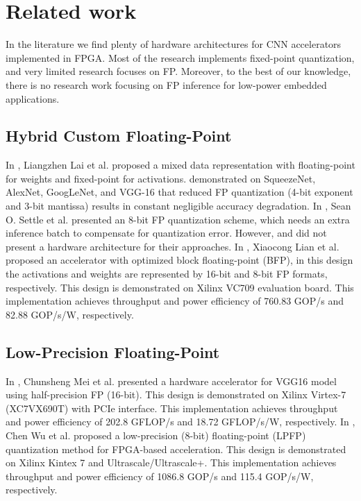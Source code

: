 \section{Related work}
\label{sec:related_work}
In the literature we find plenty of hardware architectures for CNN accelerators implemented in FPGA. Most of the research implements fixed-point quantization, and very limited research focuses on FP. Moreover, to the best of our knowledge, there is no research work focusing on FP inference for low-power embedded applications.


\subsection{Hybrid Custom Floating-Point}
In \cite{lai2017deep}, Liangzhen Lai et al. proposed a mixed data representation with floating-point for weights and fixed-point for activations. \cite{lai2017deep} demonstrated on SqueezeNet, AlexNet, GoogLeNet, and VGG-16 that reduced FP quantization (4-bit exponent and 3-bit mantissa) results in constant negligible accuracy degradation. In \cite{settle2018quantizing}, Sean O. Settle et al. presented an 8-bit FP quantization scheme, which needs an extra inference batch to compensate for quantization error. However, \cite{lai2017deep} and \cite{settle2018quantizing} did not present a hardware architecture for their approaches. In \cite{lian2019high}, Xiaocong Lian et al. proposed an accelerator with optimized block floating-point (BFP), in this design the activations and weights are represented by 16-bit and 8-bit FP formats, respectively. This design is demonstrated on Xilinx VC709 evaluation board. This implementation achieves throughput and power efficiency of 760.83 GOP/s and 82.88 GOP/s/W, respectively.

\subsection{Low-Precision Floating-Point}
In \cite{mei2017200mhz}, Chunsheng Mei et al. presented a hardware accelerator for VGG16 model using half-precision FP (16-bit). This design is demonstrated on Xilinx Virtex-7 (XC7VX690T) with PCIe interface. This implementation achieves throughput and power efficiency of 202.8 GFLOP/s and 18.72 GFLOP/s/W, respectively. In \cite{wu2021low}, Chen Wu et al. proposed a low-precision (8-bit) floating-point (LPFP) quantization method for FPGA-based acceleration. This design is demonstrated on Xilinx Kintex 7 and Ultrascale/Ultrascale+. This implementation achieves throughput and power efficiency of 1086.8 GOP/s and 115.4 GOP/s/W, respectively.

